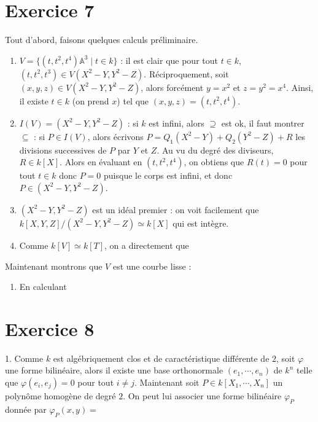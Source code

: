     \section{Exercice 7}
        Tout d'abord, faisons quelques calculs préliminaire.
        \begin{enumerate}
            \item $V = \{(t,t^2,t^4) \mathbb{A}^3 \mid t \in k\}$ : il est clair que pour tout $t \in k$, $(t,t^2,t^3) \in V(X^2 - Y, Y^2 - Z)$. Réciproquement, soit $(x,y,z) \in V(X^2 - Y, Y^2 - Z)$, alors forcément $y = x^2$ et $z = y^2 = x^4$. Ainsi, il existe $t \in k$ (on prend $x$) tel que $(x,y,z) = (t,t^2,t^4)$.
            \item $I(V) = (X^2 - Y, Y^2 - Z)$ : si $k$ est infini, alors $\supseteq$ est ok, il faut montrer $\subseteq$ : si $P \in I(V)$, alors écrivons $P = Q_1(X^2 - Y) + Q_2(Y^2 - Z) + R$ les divisions successives de $P$ par $Y$ et $Z$. Au vu du degré des diviseurs, $R \in k[X]$. Alors en évaluant en $(t,t^2,t^4)$, on obtiens que $R(t) = 0$ pour tout $t \in k$ donc $P = 0$ puisque le corps est infini, et donc $P \in (X^2 - Y, Y^2 - Z)$.
            \item $(X^2 - Y, Y^2 - Z)$ est un idéal premier : on voit facilement que $k[X,Y,Z]/(X^2 - Y, Y^2 - Z) \simeq k[X]$ qui est intègre.
            \item Comme $k[V] \simeq k[T]$, on a directement que 
        \end{enumerate}
        Maintenant montrons que $V$ est une courbe lisse :
        \begin{enumerate}
            \item En calculant 
        \end{enumerate}

    \section{Exercice 8}
        \begin{question}{1.}
            Comme $k$ est algébriquement clos et de caractéristique différente de $2$, soit $\varphi$ une forme bilinéaire, alors il existe une base orthonormale $(e_1, \cdots, e_n)$ de $k^n$ telle que $\varphi(e_i, e_j) = 0$ pour tout $i \neq j$. Maintenant soit $P \in k[X_1, \cdots, X_n]$ un polynôme homogène de degré $2$. On peut lui associer une forme bilinéaire $\varphi_P$ donnée par $\varphi_P(x,y) = $
        \end{question} 

